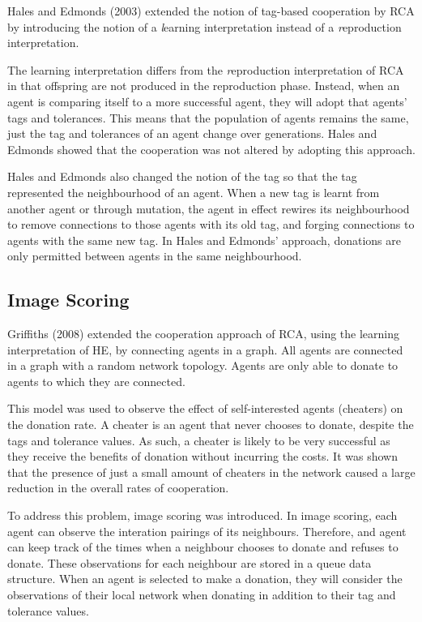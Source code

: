 Hales and Edmonds (2003) extended the notion of tag-based cooperation by RCA
by introducing the notion of a {\emph learning} interpretation instead of a {\emph reproduction} interpretation.

The learning interpretation differs from the {\emph reproduction} interpretation of RCA
in that offspring are not produced in the reproduction phase.
Instead, when an agent is comparing itself to a more successful agent,
they will adopt that agents' tags and tolerances.
This means that the population of agents remains the same,
just the tag and tolerances of an agent change over generations.
Hales and Edmonds showed that the cooperation was not altered by adopting this approach.

Hales and Edmonds also changed the notion of the tag so that
the tag represented the neighbourhood of an agent.
When a new tag is learnt from another agent or through mutation,
the agent in effect rewires its neighbourhood to remove connections to those agents with its old tag,
and forging connections to agents with the same new tag.
In Hales and Edmonds' approach, donations are only permitted between agents in the same neighbourhood.

\subsection{Image Scoring}

Griffiths (2008) extended the cooperation approach of RCA,
using the learning interpretation of HE, by connecting agents
in a graph.
All agents are connected in a graph with a random network topology.
Agents are only able to donate to agents to which they are connected.

This model was used to observe the effect of self-interested agents (cheaters)
on the donation rate.
A cheater is an agent that never chooses to donate, despite the tags and tolerance values.
As such, a cheater is likely to be very successful as they
receive the benefits of donation without incurring the costs.
It was shown that the presence of just a small amount of cheaters in the network
caused a large reduction in the overall rates of cooperation.

To address this problem, image scoring was introduced.
In image scoring, each agent can observe the interation pairings of its neighbours.
Therefore,
and agent can keep track of the times when a neighbour chooses to donate and refuses to donate.
These observations for each neighbour are stored in a queue data structure.
When an agent is selected to make a donation, they will consider the observations of their local network
when donating in addition to their tag and tolerance values.

